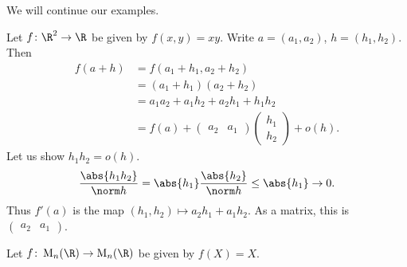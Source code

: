 
We will continue our examples.
\begin{examples}
    \item Let $f\colon \R^2 \to \R$ be given by $f(x, y) = xy$.
    Write $a = (a_1, a_2)$, $h = (h_1, h_2)$.
    Then \begin{align*}
        f(a + h) &= f(a_1 + h_1, a_2 + h_2) \\
            &= (a_1 + h_1)(a_2 + h_2) \\
            &= a_1 a_2 + a_1 h_2 + a_2 h_1 + h_1 h_2 \\
            &= f(a) + \begin{pmatrix}
                a_2 & a_1
            \end{pmatrix} \begin{pmatrix}
                h_1 \\ h_2
            \end{pmatrix} + o(h).
    \end{align*}
    Let us show $h_1 h_2 = o(h)$.
    \[
        \frac{\abs{h_1 h_2}}{\norm h}
            = \abs{h_1} \frac{\abs{h_2}}{\norm h}
            \le \abs{h_1} \to 0.
    \]
    Thus $f'(a)$ is the map $(h_1, h_2) \mapsto a_2 h_1 + a_1 h_2$.
    As a matrix, this is $\begin{pmatrix}
        a_2 & a_1
    \end{pmatrix}$.
    \item Let $f\colon \M_n(\R) \to \M_n(\R)$ be given by $f(X) = X$.


\end{examples}
